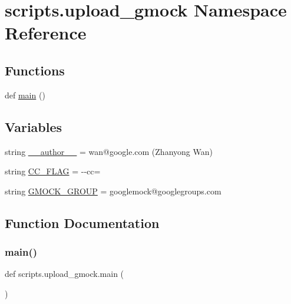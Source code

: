 \hypertarget{namespacescripts_1_1upload__gmock}{}\section{scripts.\+upload\+\_\+gmock Namespace Reference}
\label{namespacescripts_1_1upload__gmock}
\subsection*{Functions}
\begin{DoxyCompactItemize}
\item 
def \mbox{\hyperlink{namespacescripts_1_1upload__gmock_aeba19746301ef94c6f4f2d85c8cbf394}{main}} ()
\end{DoxyCompactItemize}
\subsection*{Variables}
\begin{DoxyCompactItemize}
\item 
string \mbox{\hyperlink{namespacescripts_1_1upload__gmock_a6356e02cc4f41cbcf65975b477a22a05}{\+\_\+\+\_\+author\+\_\+\+\_\+}} = \textquotesingle{}wan@google.\+com (Zhanyong Wan)\textquotesingle{}
\item 
string \mbox{\hyperlink{namespacescripts_1_1upload__gmock_a3252fcbff5897e72a08c4b769431035f}{C\+C\+\_\+\+F\+L\+AG}} = \textquotesingle{}-\/-\/cc=\textquotesingle{}
\item 
string \mbox{\hyperlink{namespacescripts_1_1upload__gmock_a0a695586608d9b8356bc19eaa383cc8f}{G\+M\+O\+C\+K\+\_\+\+G\+R\+O\+UP}} = \textquotesingle{}googlemock@googlegroups.\+com\textquotesingle{}
\end{DoxyCompactItemize}


\subsection{Function Documentation}
\mbox{\label{namespacescripts_1_1upload__gmock_aeba19746301ef94c6f4f2d85c8cbf394}} 
\subsubsection{\texorpdfstring{main()}{main()}}
{\footnotesize\ttfamily def scripts.\+upload\+\_\+gmock.\+main (\begin{DoxyParamCaption}{ }\end{DoxyParamCaption})}



